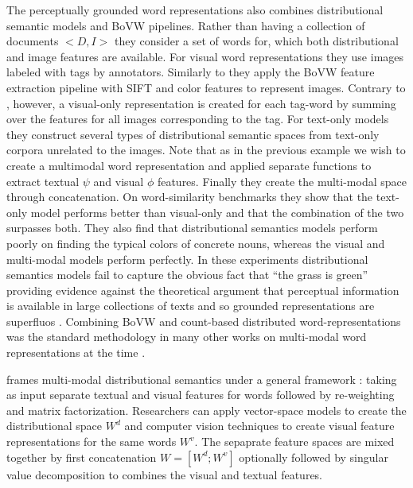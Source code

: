 The perceptually grounded word representations \cite{bruni2012distributional}
also combines distributional semantic models and BoVW pipelines.
Rather than having a collection of documents $<D, I>$ they consider a set of words for, which
both distributional and image features are available. For visual word representations
they use images labeled with tags by annotators. Similarly to \cite{feng2010visual} they
apply the BoVW feature extraction pipeline with SIFT and color features to
represent images. Contrary to \cite{feng2010visual}, however,
a visual-only representation is created for each tag-word by summing over the features
for all images corresponding to the tag.
For text-only models they construct several types of distributional semantic spaces
from text-only corpora unrelated to the images.
Note that as in the previous example we wish to create a multimodal
word representation and applied separate functions to extract textual $\psi$ and visual
$\phi$ features. Finally they create the multi-modal space through concatenation.
On word-similarity benchmarks they show that the text-only model performs better than visual-only
and that the combination of the two surpasses both.
They also find that distributional semantics
models perform poorly on finding the typical colors of concrete nouns,
whereas the visual and multi-modal models perform perfectly. In these experiments
distributional semantics models fail to capture the obvious fact that ``the grass is green''
providing evidence against the theoretical argument that perceptual information is available in
large collections of texts and so grounded representations are superfluos \cite{louwerse2011symbol}.
Combining BoVW and count-based distributed word-representations was the standard methodology
in many other works on multi-modal word representations at the time
\cite{bruni2011distributional,leong2011going,leong2011measuring}.

\cite{bruni2014multimodal} frames multi-modal distributional semantics under a general framework
: taking as input separate textual and visual features for words followed by
re-weighting and matrix factorization. Researchers can apply vector-space
models to create the distributional space $W^d$ and computer vision techniques to create
visual feature representations for the same words $W^v$. The sepaprate feature spaces
are mixed together by first concatenation $W = [W^d;W^v]$ optionally followed by singular value decomposition
to combines the visual and textual features.

